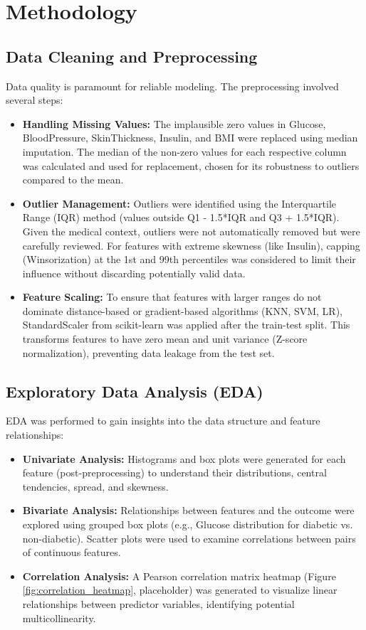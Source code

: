 \documentclass[conference]{IEEEtran}
\begin{document}
\vspace*{80}
\section{Methodology}
\subsection{Data Cleaning and Preprocessing}
Data quality is paramount for reliable modeling. The preprocessing involved several steps:
\begin{itemize}
    \item \textbf{Handling Missing Values:} The implausible zero values in Glucose, BloodPressure, SkinThickness, Insulin, and BMI were replaced using median imputation. The median of the non-zero values for each respective column was calculated and used for replacement, chosen for its robustness to outliers compared to the mean.
    \item \textbf{Outlier Management:} Outliers were identified using the Interquartile Range (IQR) method (values outside Q1 - 1.5*IQR and Q3 + 1.5*IQR). Given the medical context, outliers were not automatically removed but were carefully reviewed. For features with extreme skewness (like Insulin), capping (Winsorization) at the 1st and 99th percentiles was considered to limit their influence without discarding potentially valid data.
    \item \textbf{Feature Scaling:} To ensure that features with larger ranges do not dominate distance-based or gradient-based algorithms (KNN, SVM, LR), StandardScaler from scikit-learn was applied after the train-test split. This transforms features to have zero mean and unit variance (Z-score normalization), preventing data leakage from the test set.
\end{itemize}

\subsection{Exploratory Data Analysis (EDA)}
EDA was performed to gain insights into the data structure and feature relationships:
\begin{itemize}
    \item \textbf{Univariate Analysis:} Histograms and box plots were generated for each feature (post-preprocessing) to understand their distributions, central tendencies, spread, and skewness.
    \item \textbf{Bivariate Analysis:} Relationships between features and the outcome were explored using grouped box plots (e.g., Glucose distribution for diabetic vs. non-diabetic). Scatter plots were used to examine correlations between pairs of continuous features.
    \item \textbf{Correlation Analysis:} A Pearson correlation matrix heatmap (Figure \ref{fig:correlation_heatmap}, placeholder) was generated to visualize linear relationships between predictor variables, identifying potential multicollinearity.
\end{itemize}
\end{document}
